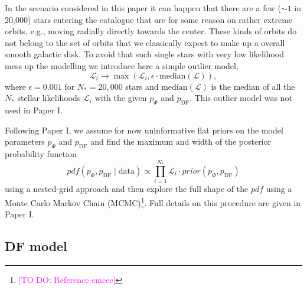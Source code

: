 \documentclass[iop,revtex4,numberedappendix,appendixfloats]{emulateapj}
\newcommand{\pdf}{\ensuremath{pdf}}
\newcommand{\Wilma}[1]{\textcolor{Magenta}{#1}}
\begin{document}
In the scenario considered in this paper it can happen that there are a few ($\sim 1$ in 20,000) stars entering the catalogue that are for some reason  on rather extreme orbits, e.g., moving radially directly towards the center. These kinds of orbits do not belong to the set of orbits that we classically expect to make up a overall smooth galactic disk. To avoid that such single stars with very low likelihood mess up the modelling we introduce here a simple outlier model,
\begin{equation*}
\mathscr{L}_i \longrightarrow \max \left( \mathscr{L}_i, \epsilon \cdot \text{median}(\mathscr{L})\right),
\end{equation*}
where $\epsilon = 0.001$ for $N_*=20,000$ stars and $\text{median}(\mathscr{L})$ is the median of all the $N_*$ stellar likelihoods $\mathscr{L}_i$ with the given $p_\Phi$ and $p_\text{DF}$. This outlier model was not used in Paper I.

Following Paper I, we assume for now uninformative flat priors on the model parameters $p_\Phi$ and $p_\text{DF}$ and find the maximum and width of the posterior probability function
\begin{equation*}
pdf(p_\Phi,p_\text{DF} \mid \text{data}) \propto \prod_{i=1}^{N_*} \mathscr{L}_i \cdot prior(p_\Phi,p_\text{DF})
\end{equation*}
using a nested-grid approach and then explore the full shape of the $\pdf$ using a Monte Carlo Markov Chain (MCMC)\footnote{\Wilma{[TO DO: Reference emcee]}}. Full details on this procedure are given in Paper I.

\subsection{DF model} \label{sec:DF_model}
\end{document}
